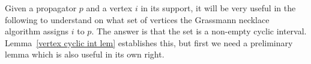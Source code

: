 \documentclass[11pt]{article}
\newcommand{\cP}{\mathcal{P}}
\theoremstyle{remark}
\theoremstyle{definition}
\begin{document}
%



Given a propagator $p$ and a vertex $i$ in its support, it will be very useful in the following to understand on what set of vertices the Grassmann necklace algorithm assigns $i$ to $p$.  The answer is that the set is a non-empty cyclic interval.  Lemma~\ref{vertex cyclic int lem} establishes this, but first we need a preliminary lemma which is also useful in its own right.
\end{document}
